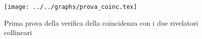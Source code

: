 \begin{figure}[h] \centering\texttt{[image: ../../graphs/prova\_coinc.tex]}\caption{Prima prova della verifica della coincidenza con i due rivelatori collineari }\label{gr:prova_coinc} \end{figure}
